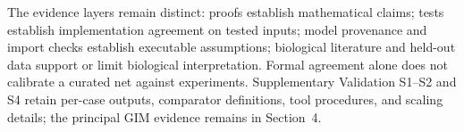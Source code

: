 The evidence layers remain distinct: proofs establish mathematical claims;
tests establish implementation agreement on tested inputs; model provenance
and import checks establish executable assumptions; biological literature and
held-out data support or limit biological interpretation. Formal agreement alone
does not calibrate a curated net against experiments. Supplementary Validation
S1--S2 and S4 retain per-case outputs, comparator definitions, tool procedures,
and scaling details; the principal GIM evidence remains in Section~4.
